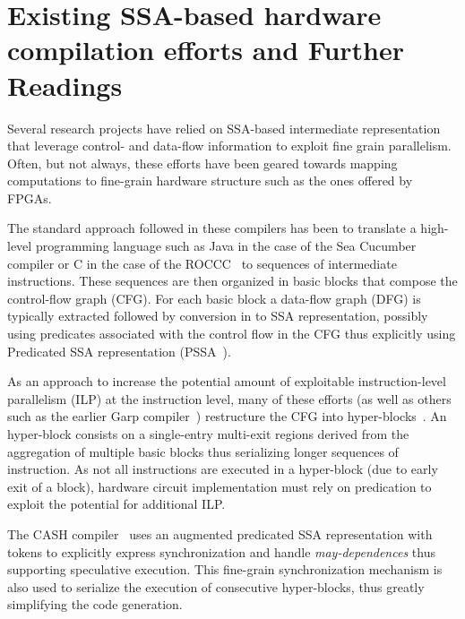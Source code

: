 \section{Existing SSA-based hardware compilation efforts and Further Readings}
Several research projects have relied on SSA-based intermediate representation 
that leverage control- and data-flow information to exploit fine grain parallelism. 
Often, but not always, these efforts have been geared towards mapping computations 
to fine-grain hardware structure such as the ones offered by FPGAs.

The standard approach followed in these compilers has been to translate a high-level programming language such as Java in the case of the Sea Cucumber~\cite{Tripp:FPL02} compiler or C in the case of the ROCCC~\cite{Najjar:ROCCC08} to sequences of intermediate instructions. 
These sequences are then organized in basic blocks that compose the control-flow graph (CFG). For each basic block a data-flow graph (DFG) is typically extracted followed by conversion in to SSA representation, possibly using predicates associated with the control flow in the CFG thus explicitly using Predicated SSA representation (PSSA~\cite{Carter:PACT99,deFerriere:SCOPES07,Stoutchinin:2001:MICRO}).

As an approach to increase the potential amount of exploitable instruction-level parallelism (ILP) at the instruction level, many of these efforts (as well as others such as the earlier Garp compiler~\cite{Callahan:Computer00}) restructure the CFG into hyper-blocks~\cite{Mahlke:Micro92}.  An hyper-block consists on a single-entry multi-exit regions derived from the aggregation of multiple basic blocks thus serializing longer sequences of instruction. 
As not all instructions are executed in a hyper-block (due to early exit of a block), hardware circuit implementation must rely on predication to exploit the potential for additional ILP. 


The CASH compiler~\cite{Budiu:FPL02} uses an augmented predicated SSA representation with tokens to explicitly express synchronization and handle {\em may-dependences} thus supporting speculative execution.  This fine-grain synchronization mechanism is also used to serialize the execution of consecutive hyper-blocks, thus greatly simplifying the code generation.\\

